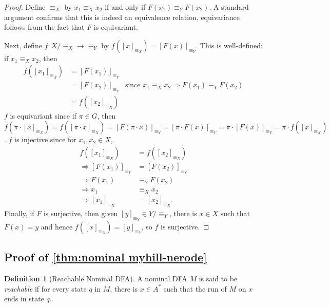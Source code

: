 \documentclass[11pt,a4paper]{amsart}
\theoremstyle{definition}
\newtheorem{definition}{Definition}
\begin{document}
  \begin{proof}
    Define $\equiv_X$ by $x_1 \equiv_X x_2$ if and only if $F(x_1) \equiv_Y F(x_2)$.
    A standard argument confirms that this is indeed an equivalence relation, equivariance follows from the fact that $F$ is equivariant.

    Next, define $f : X / \equiv_X \to \equiv_Y$ by $f([x]_{\equiv_X}) = [F(x)]_{\equiv_Y}$.
    This is well-defined: if $x_1 \equiv_X x_2$, then 
    \begin{align*}
        f([x_1]_{\equiv_X}) &= [F(x_1)]_{\equiv_Y} \\
        &= [F(x_2)]_{\equiv_Y} & \text{since } x_1 \equiv_X x_2 \Rightarrow F(x_1) \equiv_Y F(x_2) \\
        &= f([x_2]_{\equiv_X})
    \end{align*}
    $f$ is equivariant since if $\pi \in G$, then $f(\pi \cdot [x]_{\equiv_X}) = f([\pi \cdot x]_{\equiv_X}) = [F(\pi \cdot x)]_{\equiv_Y} = [\pi \cdot F(x)]_{\equiv_Y} = \pi \cdot [F(x)]_{\equiv_Y} = \pi \cdot f([x]_{\equiv_X})$.
    $f$ is injective since for $x_1, x_2 \in X$,
    \begin{align*}
        f([x_1]_{\equiv_X}) &= f([x_2]_{\equiv_X}) \\
        \Rightarrow [F(x_1)]_{\equiv_Y} &= [F(x_2)]_{\equiv_Y} \\
        \Rightarrow F(x_1) &\equiv_Y F(x_2) \\
        \Rightarrow x_1 &\equiv_X x_2 \\
        \Rightarrow [x_1]_{\equiv_X} &= [x_2]_{\equiv_X}.
    \end{align*}
    Finally, if $F$ is surjective, then given $[y]_{\equiv_Y} \in Y / \equiv_Y$, there is $x \in X$ such that $F(x) = y$ and hence $f([x]_{\equiv_X}) = [y]_{\equiv_Y}$, so $f$ is surjective.
\end{proof}


\subsection{Proof of \autoref{thm:nominal myhill-nerode}} \label{appendix:proof of nominal myhill-nerode}


\begin{definition}[Reachable Nominal DFA]
    A nominal DFA $M$ is said to be \emph{reachable} if for every state $q$ in $M$, there is $x \in A^*$ such that the run of $M$ on $x$ ends in state $q$.
\end{definition}
\end{document}
